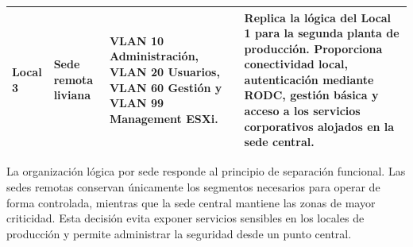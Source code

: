 \documentclass[11pt, a4paper, oneside]{report}
\begin{document}
\begin{xltabular}{\textwidth}{@{}|L{2.4cm}|L{3.1cm}|X|X|@{}}
{\small Local 3} &
{\small Sede remota liviana} &
{\small VLAN 10 Administración, VLAN 20 Usuarios, VLAN 60 Gestión y VLAN 99 Management ESXi.} &
{\small Replica la lógica del Local 1 para la segunda planta de producción. Proporciona conectividad local, autenticación mediante RODC, gestión básica y acceso a los servicios corporativos alojados en la sede central.} \\ \hline

\end{xltabular}

\normalsize

La organización lógica por sede responde al principio de separación funcional. Las sedes remotas conservan únicamente los segmentos necesarios para operar de forma controlada, mientras que la sede central mantiene las zonas de mayor criticidad. Esta decisión evita exponer servicios sensibles en los locales de producción y permite administrar la seguridad desde un punto central.

\renewcommand{\arraystretch}{1.3}
\footnotesize
{}
\end{document}
